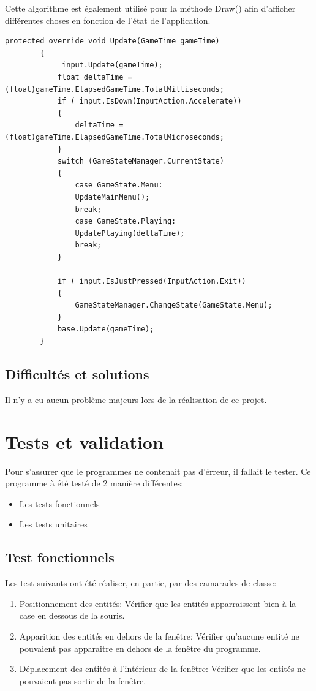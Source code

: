 \documentclass[10pt,a4paper]{article}
\begin{document}
	Cette algorithme est également utilisé pour la méthode Draw() afin d'afficher différentes choses en fonction de l'état de l'application.
	\begin{lstlisting}[style=csharp]
		protected override void Update(GameTime gameTime)
		{
			_input.Update(gameTime);
			float deltaTime = (float)gameTime.ElapsedGameTime.TotalMilliseconds;
			if (_input.IsDown(InputAction.Accelerate))
			{
				deltaTime = (float)gameTime.ElapsedGameTime.TotalMicroseconds;
			}
			switch (GameStateManager.CurrentState)
			{
				case GameState.Menu:
				UpdateMainMenu();
				break;
				case GameState.Playing:
				UpdatePlaying(deltaTime);
				break;
			}
			
			if (_input.IsJustPressed(InputAction.Exit))
			{
				GameStateManager.ChangeState(GameState.Menu);
			}
			base.Update(gameTime);
		}
	\end{lstlisting}
	
	\subsection{Difficultés et solutions}	
	Il n'y a eu aucun problème majeurs lors de la réalisation de ce projet.
	
	\section{Tests et validation}
	Pour s'assurer que le programmes ne contenait pas d'érreur, il fallait le tester. Ce programme à été testé de 2 manière différentes:
	\begin{itemize}
		\item Les tests fonctionnels
		\item Les tests unitaires
	\end{itemize}
	
	\subsection{Test fonctionnels}
	Les test suivants ont été réaliser, en partie, par des camarades de classe:
		\begin{enumerate}
		\item Positionnement des entités: Vérifier que les entités apparraissent bien à la case en dessous de la souris.
		\item Apparition des entités en dehors de la fenêtre: Vérifier qu'aucune entité ne pouvaient pas apparaitre en dehors de la fenêtre du programme.
		\item Déplacement des entités à l'intérieur de la fenêtre: Vérifier que les entités ne pouvaient pas sortir de la fenêtre.
	\end{enumerate}
	
\end{document}
